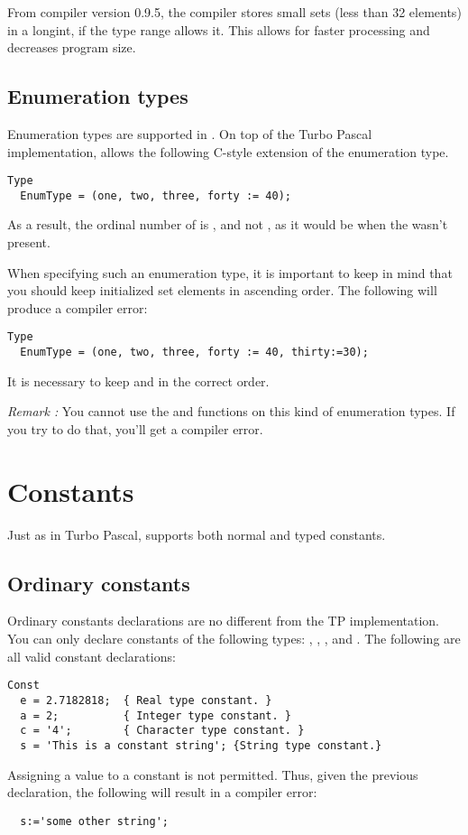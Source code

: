 \documentclass{report}
\begin{document}
From compiler version 0.9.5, the compiler stores small sets (less than 32
elements) in a longint, if the type range allows it. This allows for faster
processing and decreases program size.

\subsection{Enumeration types}

Enumeration types are supported in \fpc. On top of the Turbo Pascal
implementation, \fpc allows the following C-style extension of the
enumeration type.
\begin{verbatim}
Type
  EnumType = (one, two, three, forty := 40);
\end{verbatim}
As a result, the ordinal number of  is , and not ,
as it would be when the  wasn't present.

When specifying such an enumeration type, it is important to keep in mind
that you should keep initialized set elements in ascending order. The
following will produce a compiler error:
\begin{verbatim}
Type
  EnumType = (one, two, three, forty := 40, thirty:=30);
\end{verbatim}
It is necessary to keep  and  in the correct order.

{\em Remark :} You cannot use the  and  functions on
this kind of enumeration types. If you try to do that, you'll get a compiler
error.

\section{Constants}

Just as in Turbo Pascal, \fpc supports both normal and typed constants.
\subsection{Ordinary constants}
Ordinary constants declarations are no different from the TP implementation. 
You can only declare constants of the following types: ,
, , and . 
The following are all valid constant declarations:
\begin{verbatim}
Const
  e = 2.7182818;  { Real type constant. }
  a = 2;          { Integer type constant. }
  c = '4';        { Character type constant. }
  s = 'This is a constant string'; {String type constant.}
\end{verbatim}
Assigning a value to a constant is not permitted. Thus, given the previous
declaration, the following will result in a compiler error:
\begin{verbatim}
  s:='some other string';
\end{verbatim}
\end{document}
